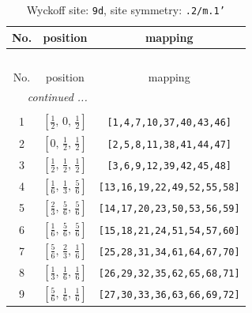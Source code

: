 \documentclass[fleqn,8pt]{jsarticle}
\begin{document}
\begin{longtable}{ccc}
\caption{Wyckoff site: {\tt 9d}, site symmetry: {\tt .2/m.1'}}
 \\
 \hline \hline
No. & position & mapping \\ \hline \endfirsthead

\multicolumn{2}{l}{\tablename\ \thetable{}} \\
 \hline \hline
No. & position & mapping \\ \hline \endhead

 \hline \hline
\multicolumn{2}{r}{\footnotesize\it continued ...} \\ \endfoot

 \hline \hline
\multicolumn{2}{r}{} \\ \endlastfoot

1 & $\left[ \frac{1}{2},\, 0,\, \frac{1}{2} \right]$ & {\tt [1,4,7,10,37,40,43,46]} \\ \hline
2 & $\left[ 0,\, \frac{1}{2},\, \frac{1}{2} \right]$ & {\tt [2,5,8,11,38,41,44,47]} \\ \hline
3 & $\left[ \frac{1}{2},\, \frac{1}{2},\, \frac{1}{2} \right]$ & {\tt [3,6,9,12,39,42,45,48]} \\ \hline
4 & $\left[ \frac{1}{6},\, \frac{1}{3},\, \frac{5}{6} \right]$ & {\tt [13,16,19,22,49,52,55,58]} \\ \hline
5 & $\left[ \frac{2}{3},\, \frac{5}{6},\, \frac{5}{6} \right]$ & {\tt [14,17,20,23,50,53,56,59]} \\ \hline
6 & $\left[ \frac{1}{6},\, \frac{5}{6},\, \frac{5}{6} \right]$ & {\tt [15,18,21,24,51,54,57,60]} \\ \hline
7 & $\left[ \frac{5}{6},\, \frac{2}{3},\, \frac{1}{6} \right]$ & {\tt [25,28,31,34,61,64,67,70]} \\ \hline
8 & $\left[ \frac{1}{3},\, \frac{1}{6},\, \frac{1}{6} \right]$ & {\tt [26,29,32,35,62,65,68,71]} \\ \hline
9 & $\left[ \frac{5}{6},\, \frac{1}{6},\, \frac{1}{6} \right]$ & {\tt [27,30,33,36,63,66,69,72]} \\
\end{longtable}
\renewcommand{\arraystretch}{1.2}
\end{document}
